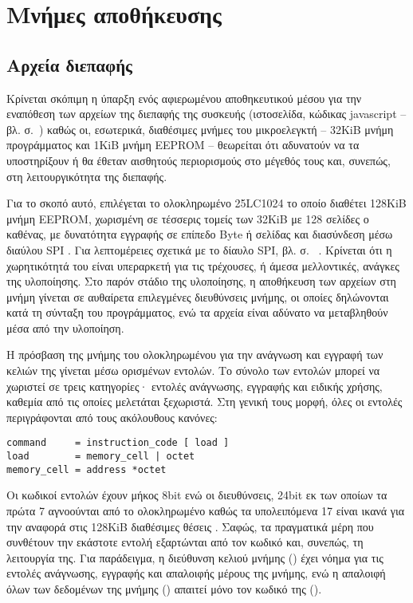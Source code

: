 
\section{Μνήμες αποθήκευσης}

\subsection{Αρχεία διεπαφής}
\label{subsec:external-memory}

Κρίνεται σκόπιμη η ύπαρξη ενός αφιερωμένου αποθηκευτικού μέσου για την εναπόθεση
των αρχείων της διεπαφής της συσκευής (ιστοσελίδα, κώδικας javascript  --
βλ.  σ.~\pageref{subsec:network:files}) καθώς οι,
εσωτερικά, διαθέσιμες μνήμες του μικροελεγκτή -- 32KiB μνήμη προγράμματος και
1KiB μνήμη EEPROM -- θεωρείται ότι αδυνατούν να τα υποστηρίξουν ή θα έθεταν
αισθητούς περιορισμούς στο μέγεθός τους και, συνεπώς, στη λειτουργικότητα της
διεπαφής.

Για το σκοπό αυτό, επιλέγεται το ολοκληρωμένο 25LC1024 το οποίο διαθέτει 128KiB
μνήμη EEPROM, χωρισμένη σε τέσσερις τομείς των 32KiB με 128 σελίδες ο καθένας,
με δυνατότητα εγγραφής σε επίπεδο Byte ή σελίδας και διασύνδεση μέσω διαύλου SPI
\parencite[1]{25lc1024}. Για λεπτομέρειες σχετικά με το δίαυλο SPI, βλ. σ.~%
\pageref{subsec:spi}. Κρίνεται ότι η χωρητικότητά του είναι υπεραρκετή για τις
τρέχουσες, ή άμεσα μελλοντικές, ανάγκες της υλοποίησης.
Στο παρόν στάδιο της υλοποίησης, η αποθήκευση των αρχείων στη μνήμη γίνεται σε
αυθαίρετα επιλεγμένες διευθύνσεις μνήμης, οι οποίες δηλώνονται κατά τη σύνταξη
του προγράμματος, ενώ τα αρχεία είναι αδύνατο να μεταβληθούν μέσα από την
υλοποίηση.

Η πρόσβαση της μνήμης του ολοκληρωμένου για την ανάγνωση και εγγραφή των κελιών
της γίνεται μέσω ορισμένων εντολών. Το σύνολο των εντολών μπορεί να χωριστεί σε
τρεις κατηγορίες· εντολές ανάγνωσης, εγγραφής και ειδικής χρήσης, καθεμία από
τις οποίες μελετάται ξεχωριστά. Στη γενική τους μορφή, όλες οι εντολές
περιγράφονται από τους ακόλουθους κανόνες:
\begin{lstlisting}
command     = instruction_code [ load ]
load        = memory_cell | octet
memory_cell = address *octet
\end{lstlisting}
Οι κωδικοί εντολών έχουν μήκος 8bit ενώ οι διευθύνσεις, 24bit εκ των οποίων τα
πρώτα 7 αγνοούνται από το ολοκληρωμένο καθώς τα υπολειπόμενα 17 είναι ικανά για
την αναφορά στις 128KiB διαθέσιμες θέσεις \parencite[6--7]{25lc1024}. Σαφώς,
τα πραγματικά μέρη που συνθέτουν την εκάστοτε εντολή εξαρτώνται από τον κωδικό
και, συνεπώς, τη λειτουργία της. Για παράδειγμα, η διεύθυνση κελιού μνήμης
() έχει νόημα για τις εντολές ανάγνωσης, εγγραφής και
απαλοιφής μέρους της μνήμης, ενώ η απαλοιφή όλων των δεδομένων της μνήμης
() απαιτεί μόνο τον κωδικό της ().

